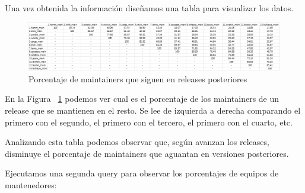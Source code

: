 \documentclass[a4paper, 12pt]{book}
\begin{document}
	Una vez obtenida la información diseñamos una tabla para visualizar los datos.
	
	\begin{figure}[h]
		\centering
		\includegraphics[width=18cm, keepaspectratio]{img/Tabla porcentajes maintainers.png}
		\caption{Porcentaje de maintainers que siguen en releases posteriores}
		\label{fig:tabla_1}
	\end{figure}
	
	En la Figura ~\ref{fig:tabla_1} podemos ver cual es el porcentaje de los maintainers de un release que se mantienen en el resto. Se lee de izquierda a derecha comparando el primero con el segundo, el primero con el tercero, el primero con el cuarto, etc.
	
	Analizando esta tabla podemos observar que, según avanzan los releases, disminuye el porcentaje de maintainers que aguantan en versiones posteriores.
	
	Ejecutamos una segunda query para observar los porcentajes de equipos de mantenedores:
	
\end{document}

